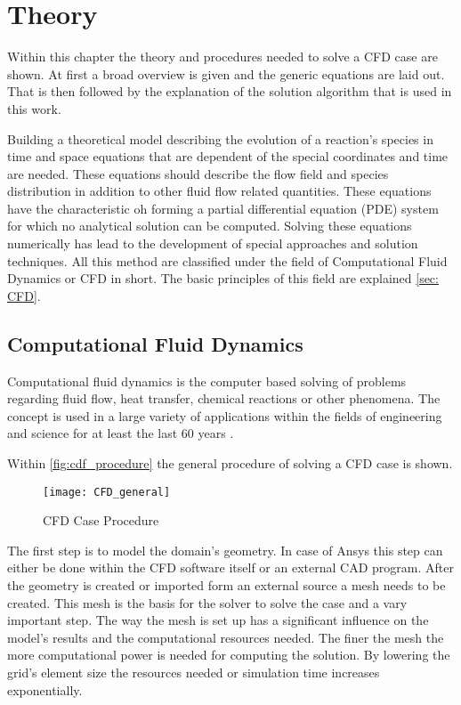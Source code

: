 \documentclass[../thesis.tex]{subfiles}
\begin{document}
\chapter{Theory}
\label{chp:theory}

Within this chapter the theory and procedures needed to solve a CFD case are shown. At first a broad overview is given and the generic equations are laid out. That is then followed by the explanation of the solution algorithm that is used in this work.

Building a theoretical model describing the evolution of a reaction's species in time and space equations that are dependent of the special coordinates and time are needed. These equations should describe the flow field and species distribution in addition to other fluid flow related quantities. These equations have the characteristic oh forming a partial differential equation (PDE) system for which no analytical solution can be computed. Solving these equations numerically has lead to the development of special approaches and solution techniques. All this method are classified under the field of Computational Fluid Dynamics or CFD in short. The basic principles of this field are explained \autoref{sec: CFD}. 
 
\section{Computational Fluid Dynamics}
\label{sec: CFD}

Computational fluid dynamics is the computer based solving of problems regarding fluid flow, heat transfer, chemical reactions or other phenomena. The concept is used in a large variety of applications within the fields of engineering and science for at least the last 60 years \cite{versteeg2007introduction}.

Within \autoref{fig:cdf_procedure} the general procedure of solving a CFD case is shown.
\begin{figure}[htbp]
	\centering
	\texttt{[image: CFD\_general]}
	\caption{CFD Case Procedure}
	\label{fig:cdf_procedure}
\end{figure}

The first step is to model the domain's geometry. In case of Ansys this step can either be done within the CFD software itself or an external CAD program. After the geometry is created or imported form an external source a mesh needs to be created. This mesh is the basis for the solver to solve the case and a vary important step. The way the mesh is set up has a significant influence on the model's results and the computational resources needed. The finer the mesh the more computational power is needed for computing the solution. By lowering the grid's element size the resources needed or simulation time increases exponentially.
\end{document}

